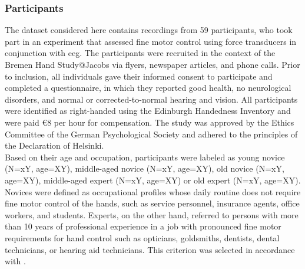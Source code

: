 \subsubsection{Participants}
\label{methods:datasets:I:participants}
The dataset considered here contains recordings from 59 participants, who took part in an experiment that assessed fine motor control using force transducers in conjunction with \gls{eeg}. The participants were recruited in the context of the Bremen Hand Study@Jacobs via flyers, newspaper articles, and phone calls. Prior to inclusion, all individuals gave their informed consent to participate and completed a questionnaire, in which they reported good health, no neurological disorders, and normal or corrected-to-normal hearing and vision. All participants were identified as right-handed using the Edinburgh Handedness Inventory \cite{Oldfield1971} and were paid \euro{8} per hour for compensation. The study was approved by the Ethics Committee of the German Psychological Society and adhered to the principles of the Declaration of Helsinki.\\
Based on their age and occupation, participants were labeled as young novice (N=xY, age=XY), middle-aged novice (N=xY, age=XY), old novice (N=xY, age=XY), middle-aged expert (N=xY, age=XY) or old expert (N=xY, age=XY). Novices were defined as occupational profiles whose daily routine does not require fine motor control of the hands, such as service personnel, insurance agents, office workers, and students. Experts, on the other hand, referred to persons with more than 10 years of professional experience in a job with pronounced fine motor requirements for hand control such as opticians, goldsmiths, dentists, dental technicians, or hearing aid technicians. This criterion was selected in accordance with \cite{Ericsson1991}. 

